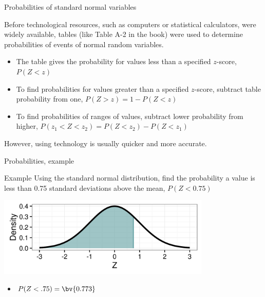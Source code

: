 \documentclass[xcolor=table, handout]{beamer}
\begin{document}
\begin{frame}{Probabilities of standard normal variables}
\begin{block}{}
Before technological resources, such as computers or statistical calculators, were widely available, tables (like Table A-2 in the book) were used to determine probabilities of events of normal random variables.
\begin{itemize}
\pause\item The table gives the probability for values less than a specified $z$-score, $P(Z < z)$
\pause\item To find probabilities for values greater than a specified $z$-score, subtract table probability from one, $P(Z > z) = 1-P(Z<z)$
\pause\item To find probabilities of ranges of values, subtract lower probability from higher, $P(z_1 < Z < z_2) = P(Z < z_2) - P(Z < z_1)$
\end{itemize}
\medskip
\pause However, using technology is usually quicker and more accurate.
\end{block}
\end{frame}

\begin{frame}{Probabilities, example}
\begin{exampleblock}{Example}
Using the standard normal distribution, find the probability a value is less than 0.75 standard deviations above the mean, $P(Z < 0.75)$\\
\smallskip
{\centering
\includegraphics[width=4in]{../images/ch6_ex01}
\par}
\begin{itemize}
\pause\item $P(Z < .75) = \bv{0.773}$
\end{itemize}
\end{exampleblock}
\end{frame}
\end{document}
